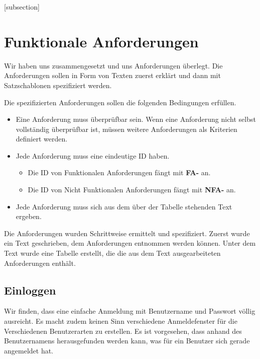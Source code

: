 
\clearpage

[subsection]
\newcommand\printfreqnr{\stepcounter{freq}FA-\the\value{subsection}\num[minimum-integer-digits=2]{\thefreq}}

\section{Funktionale Anforderungen}
Wir haben uns zusammengesetzt und uns Anforderungen überlegt. Die Anforderungen sollen in Form von Texten zuerst erklärt und dann mit Satzschablonen spezifiziert werden. 

\vspace{6pt}

Die spezifizierten Anforderungen sollen die folgenden Bedingungen erfüllen.
\begin{itemize}
	\item Eine Anforderung muss überprüfbar sein. Wenn eine Anforderung nicht selbst vollständig überprüfbar ist, müssen weitere Anforderungen als Kriterien definiert werden.
	\item Jede Anforderung muss eine eindeutige ID haben. 
	\begin{itemize}
		\item Die ID von Funktionalen Anforderungen fängt mit \textbf{FA-} an.
		\item Die ID von Nicht Funktionalen Anforderungen fängt mit \textbf{NFA-} an.
	\end{itemize}
	\item Jede Anforderung muss sich aus dem über der Tabelle stehenden Text ergeben.
\end{itemize}

Die Anforderungen wurden Schrittweise ermittelt und spezifiziert. Zuerst wurde ein Text geschrieben, dem Anforderungen entnommen werden können. Unter dem Text wurde eine Tabelle erstellt, die die aus dem Text ausgearbeiteten Anforderungen enthält.

\newpage

\subsection{Einloggen}
Wir finden, dass eine einfache Anmeldung mit Benutzername und Passwort völlig ausreicht. Es macht zudem keinen Sinn verschiedene Anmeldefenster für die Verschiedenen Benutzerarten zu erstellen. Es ist vorgesehen, dass anhand des Benutzernamens herausgefunden werden kann, was für ein Benutzer sich gerade angemeldet hat.

